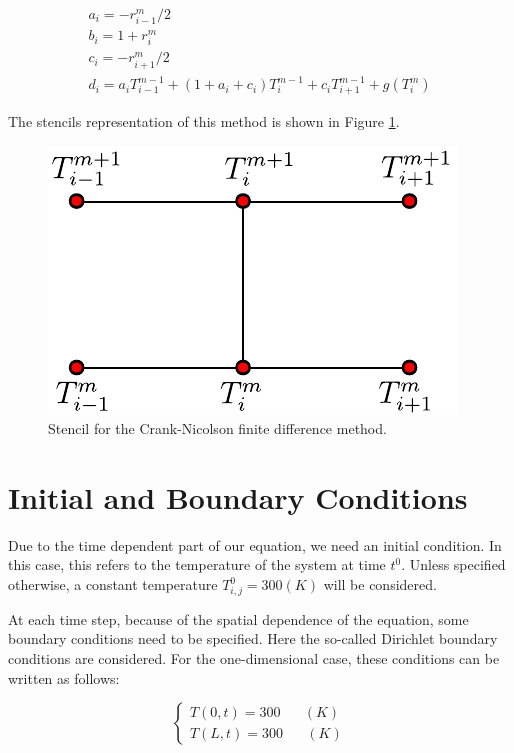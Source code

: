\begin{equation}
    \begin{gathered}
        a_i = -r^m_{i-1}/2 \\
        b_i = 1 + r^m_{i}\\
        c_i = - r^m_{i+1}/2 \\
        d_i = a_i T_{i-1}^{m-1} + (1 + a_i + c_i) T^{m-1}_{i} + c_i T_{i+1}^{m-1} + g(T_i^m)
    \end{gathered}
\end{equation}

The stencils representation of this method is shown in Figure \ref{fig:StencilCrNic}.

\begin{figure}[h]
    \centering
    \includegraphics[width=0.35\columnwidth]{Stencils_FiniteDifferences/CrkNic.pdf}
    \caption{Stencil for the Crank-Nicolson finite difference method.}
    \label{fig:StencilCrNic}
\end{figure}

\section{Initial and Boundary Conditions}

Due to the time dependent part of our equation, we need an initial condition. In this case, this refers to the temperature of the system at time $t^0$. Unless specified otherwise, a constant temperature $T_{i,j}^0 = 300 (K)$ will be considered.

At each time step, because of the spatial dependence of the equation, some boundary conditions need to be specified. Here the so-called Dirichlet boundary conditions are considered. For the one-dimensional case, these conditions can be written as follows: 

\begin{equation}
    \begin{cases}
      T(0,t) = 300 \mspace{30mu} (K) \\
      T(L,t) = 300 \mspace{30mu} (K) 
    \end{cases}
\end{equation}

